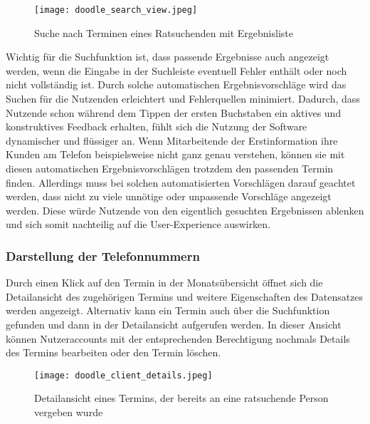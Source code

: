 \begin{figure}[H]
    \caption{Suche nach Terminen eines Ratsuchenden mit Ergebnisliste}
    \centering
    \texttt{[image: doodle\_search\_view.jpeg]}
\end{figure}

Wichtig für die Suchfunktion ist, dass passende Ergebnisse auch angezeigt
werden, wenn die Eingabe in der Suchleiste eventuell Fehler enthält oder noch
nicht vollständig ist. Durch solche automatischen Ergebnisvorschläge wird das
Suchen für die Nutzenden erleichtert und Fehlerquellen minimiert. Dadurch, dass
Nutzende schon während dem Tippen der ersten Buchstaben ein aktives und
konstruktives Feedback erhalten, fühlt sich die Nutzung der Software
dynamischer und flüssiger an\cite{autoCompletion}. Wenn Mitarbeitende der
Erstinformation ihre Kunden am Telefon beispielsweise nicht ganz genau
verstehen, können sie mit diesen automatischen Ergebnisvorschlägen trotzdem den
passenden Termin finden. Allerdings muss bei solchen automatisierten
Vorschlägen darauf geachtet werden, dass nicht zu viele unnötige oder
unpassende Vorschläge angezeigt werden. Diese würde Nutzende von den eigentlich
gesuchten Ergebnissen ablenken und sich somit nachteilig auf die
User-Experience auswirken\cite{autosuggModeration}.

\subsubsection{Darstellung der Telefonnummern}

Durch einen Klick auf den Termin in der Monatsübersicht öffnet sich die
Detailansicht des zugehörigen Termins und weitere Eigenschaften des Datensatzes
werden angezeigt. Alternativ kann ein Termin auch über die Suchfunktion
gefunden und dann in der Detailansicht aufgerufen werden. In dieser Ansicht
können Nutzeraccounts mit der entsprechenden Berechtigung nochmals Details des
Termins bearbeiten oder den Termin löschen.

\begin{figure}[H]
    \caption{Detailansicht eines Termins, der bereits an eine ratsuchende Person vergeben wurde}
    \centering
    \texttt{[image: doodle\_client\_details.jpeg]}
\end{figure}

